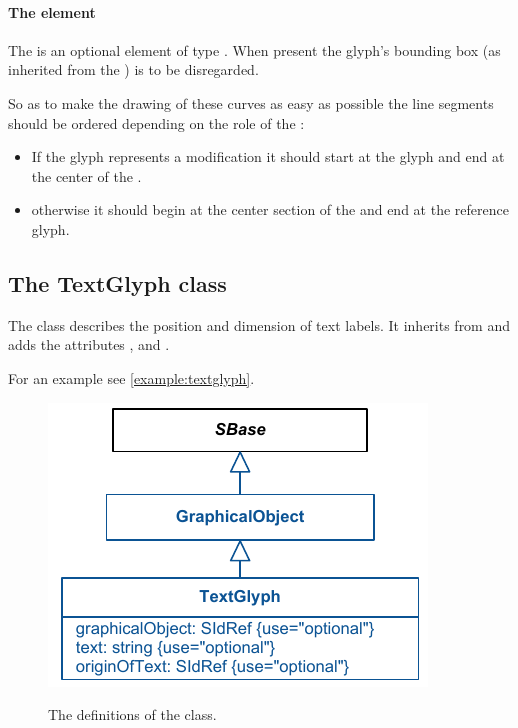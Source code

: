 \paragraph{The  element}
The  is an optional element of type \Curve. When present 
the glyph's bounding box (as inherited from the \GraphicalObject) is to 
be disregarded. 

So as to make the drawing of these curves as easy as possible the line 
segments should be ordered depending on the role of the \ReferenceGlyph:

\begin{itemize}
	\item If the glyph represents a modification it should start at the glyph and end at the center of the \GeneralGlyph.
	\item otherwise it should begin at the center section of the \GeneralGlyph and end at the reference glyph. 
\end{itemize}


\subsection{The TextGlyph class}
\label{textglyph-class}
The \TextGlyph class describes the position and dimension of text 
labels. It inherits from \GraphicalObject and adds the attributes 
,  and . 


For an example see \ref{example:textglyph}.

\begin{figure}[!h]
\includegraphics{uml/layout-textglyph-uml}\\
\caption{The definitions of the \TextGlyph class.}
\label{uml:textglyph}
\end{figure}

